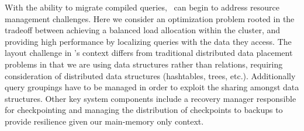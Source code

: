With the ability to migrate compiled queries, \compiler\ can begin to address
resource management challenges. Here we consider an optimization problem rooted
in the tradeoff between achieving a balanced load allocation within the cluster,
and providing high performance by localizing queries with the data they access.
The layout challenge in \compiler's context differs from traditional
distributed data placement problems in that we are using data structures
rather than relations, requiring consideration of distributed data
structures (hashtables, trees, etc.). Additionally query groupings have to be
managed in order to exploit the sharing amongst data structures. Other key
system components include a recovery manager responsible for checkpointing and
managing the distribution of checkpoints to backups to provide resilience
given our main-memory only context.

